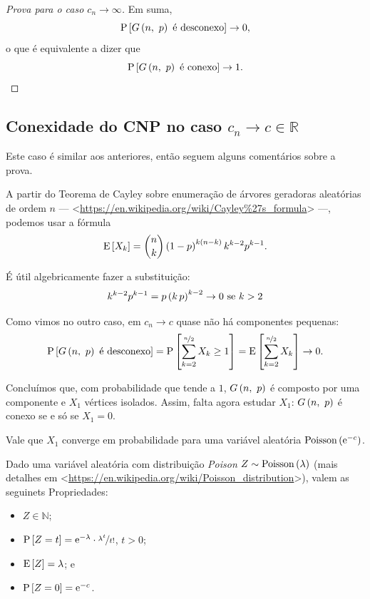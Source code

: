 \begin{proof}[Prova para o caso $c_n\rightarrow\infty$]
  Em suma, 
  \[
    \mathrm{P}\left[G\left(n,\ p\vphantom{1j}\right)\text{ é desconexo}\vphantom{1j}\right] \rightarrow 0,
  \]
  o que é equivalente a dizer que
  \[
    \mathrm{P}\left[G\left(n,\ p\vphantom{1j}\right)\text{ é conexo}\vphantom{1j}\right] \rightarrow 1.
  \]
\end{proof}

\subsection{Conexidade do CNP no caso $c_n\rightarrow c\in\mathds{R}$}

Este caso é similar aos anteriores, então seguem alguns comentários sobre a prova.

A partir do Teorema de Cayley sobre enumeração de árvores geradoras aleatórias de ordem $n$ --- <\href{https://en.wikipedia.org/wiki/Cayley%27s_formula}{https://en.wikipedia.org/wiki/Cayley\%27s\_formula}> ---, podemos usar a fórmula
\[
  \mathrm{E}\left[X_k\vphantom{1j}\right] = \binom{n}{k} \left(1-p\vphantom{1j}\right)^{k\left(n-k\vphantom{1j}\right)} k^{k-2} p^{k-1}.
\]

É útil algebricamente fazer a substituição:
\[
  k^{k-2} p^{k-1} = p\left(k\,p\vphantom{1j}\right)^{k-2} \rightarrow 0 \text{ se } k>2
\]

Como vimos no outro caso, em $c_n\rightarrow c$ quase não há componentes pequenas:
\[
  \mathrm{P}\left[G\left(n,\ p\vphantom{1j}\right)\text{ é desconexo}\vphantom{1j}\right] =
  \mathrm{P}\left[\sum_{k=2}^{\nicefrac{n}{2}} X_k \geq 1\vphantom{1j}\right] = \mathrm{E}\left[\sum_{k=2}^{\nicefrac{n}{2}} X_k\vphantom{1j}\right] \rightarrow 0.
\]

Concluímos que, com probabilidade que tende a $1$, $G\left(n,\ p\vphantom{1j}\right)$ é composto por uma componente e $X_1$ vértices isolados. Assim, falta agora estudar $X_1$: $G\left(n,\ p\vphantom{1j}\right)$ é conexo se e só se $X_1=0$.

\begin{fato}
  Vale que $X_1$ converge em probabilidade para uma variável aleatória $\mathrm{Poisson}\left(\mathrm{e}^{-c}\vphantom{1j}\right)$.
\end{fato}

Dado uma variável aleatória com distribuição \textit{Poison} $Z\sim\mathrm{Poisson}\left(\lambda\vphantom{1j}\right)$ (mais detalhes em <\href{https://en.wikipedia.org/wiki/Poisson_distribution}{https://en.wikipedia.org/wiki/Poisson\_distribution}>), valem as seguinets Propriedades:
\begin{itemize}
  \item $Z\in\mathds{N}$;
  \item $\mathrm{P}\left[Z=t\vphantom{1j}\right] = \mathrm{e}^{-\lambda}\cdot\nicefrac{\lambda^t}{t!}$, $t>0$;
  \item $\mathrm{E}\left[Z\vphantom{1j}\right] = \lambda$; e 
  \item $\mathrm{P}\left[Z=0\vphantom{1j}\right] = \mathrm{e}^{-c}$.
\end{itemize}

